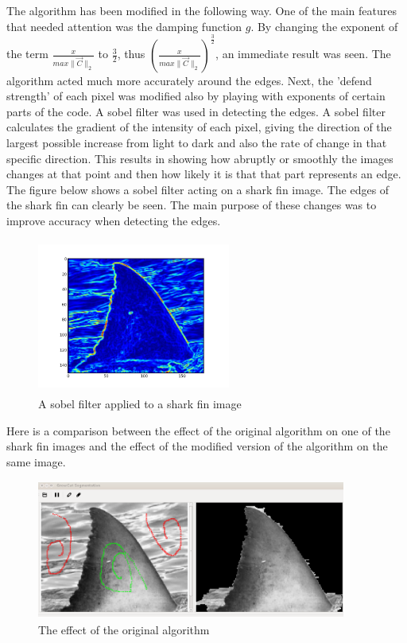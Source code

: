 \documentclass[a4paper,10pt]{article}
\begin{document}
\noindent The algorithm has been modified in the following way.  One of the main features that needed attention was the damping function $g$.  
By changing the exponent of the term $\frac{x}{max\| \overrightarrow{C} \|_{2}}$ to $\frac{3}{2}$, thus $\left ({\frac{x}{max\| \overrightarrow{C} \|_{2}}}\right ) ^\frac{3}{2}$,
an immediate result was seen.  The algorithm acted much more accurately around the edges.  Next, the 'defend strength' of each pixel was modified also by playing with exponents
of certain parts of the code.  A sobel filter was used in detecting the edges.  A sobel filter calculates the gradient of the intensity of each pixel, giving the direction of the largest possible increase from light to dark and also the rate of change in that specific direction.   This results in showing how abruptly or smoothly the images changes at that point and then how likely it is that that part represents an edge.  The figure below shows a sobel filter acting on a shark fin image.  The edges of the shark fin can clearly be seen.  The main purpose of these changes was to improve accuracy when detecting the edges.
\\
\begin{figure}[H]
 \centering
 \includegraphics[width=2.5in, height=2in]{haais}
 \caption{A sobel filter applied to a shark fin image}
 \label{fin1}
\end{figure}

\newpage
\noindent Here is a comparison between the effect of the original algorithm on one of the shark fin images and the effect of the modified version of the algorithm on the same image.
\begin{figure}[H]
 \centering
 \includegraphics[width=4in, height=1.8in]{haaio}
 \caption{The effect of the original algorithm}
 \label{fin1}
\end{figure}
\end{document}
